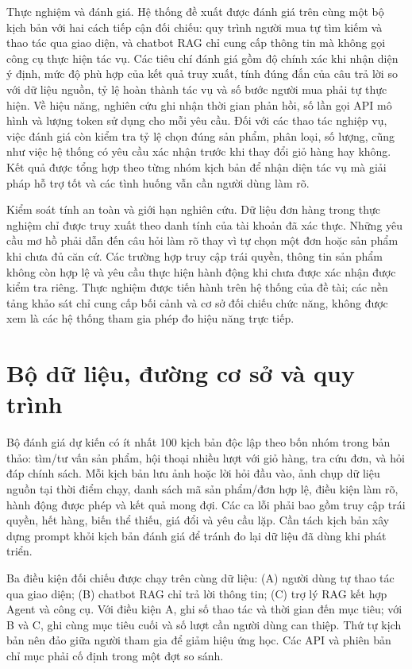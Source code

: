 \documentclass[12pt,a4paper,oneside]{report}
\begin{document}
Thực nghiệm và đánh giá. Hệ thống đề xuất được đánh giá trên cùng một bộ kịch bản với hai cách tiếp cận đối chiếu: quy trình người mua tự tìm kiếm và thao tác qua giao diện, và chatbot RAG chỉ cung cấp thông tin mà không gọi công cụ thực hiện tác vụ. Các tiêu chí đánh giá gồm độ chính xác khi nhận diện ý định, mức độ phù hợp của kết quả truy xuất, tính đúng đắn của câu trả lời so với dữ liệu nguồn, tỷ lệ hoàn thành tác vụ và số bước người mua phải tự thực hiện. Về hiệu năng, nghiên cứu ghi nhận thời gian phản hồi, số lần gọi API mô hình và lượng token sử dụng cho mỗi yêu cầu. Đối với các thao tác nghiệp vụ, việc đánh giá còn kiểm tra tỷ lệ chọn đúng sản phẩm, phân loại, số lượng, cũng như việc hệ thống có yêu cầu xác nhận trước khi thay đổi giỏ hàng hay không. Kết quả được tổng hợp theo từng nhóm kịch bản để nhận diện tác vụ mà giải pháp hỗ trợ tốt và các tình huống vẫn cần người dùng làm rõ.

Kiểm soát tính an toàn và giới hạn nghiên cứu. Dữ liệu đơn hàng trong thực nghiệm chỉ được truy xuất theo danh tính của tài khoản đã xác thực. Những yêu cầu mơ hồ phải dẫn đến câu hỏi làm rõ thay vì tự chọn một đơn hoặc sản phẩm khi chưa đủ căn cứ. Các trường hợp truy cập trái quyền, thông tin sản phẩm không còn hợp lệ và yêu cầu thực hiện hành động khi chưa được xác nhận được kiểm tra riêng. Thực nghiệm được tiến hành trên hệ thống của đề tài; các nền tảng khảo sát chỉ cung cấp bối cảnh và cơ sở đối chiếu chức năng, không được xem là các hệ thống tham gia phép đo hiệu năng trực tiếp.

\section{Bộ dữ liệu, đường cơ sở và quy trình}
Bộ đánh giá dự kiến có ít nhất 100 kịch bản độc lập theo bốn nhóm trong bản thảo: tìm/tư vấn sản phẩm, hội thoại nhiều lượt với giỏ hàng, tra cứu đơn, và hỏi đáp chính sách. Mỗi kịch bản lưu ảnh hoặc lời hỏi đầu vào, ảnh chụp dữ liệu nguồn tại thời điểm chạy, danh sách mã sản phẩm/đơn hợp lệ, điều kiện làm rõ, hành động được phép và kết quả mong đợi. Các ca lỗi phải bao gồm truy cập trái quyền, hết hàng, biến thể thiếu, giá đổi và yêu cầu lặp. Cần tách kịch bản xây dựng prompt khỏi kịch bản đánh giá để tránh đo lại dữ liệu đã dùng khi phát triển.

Ba điều kiện đối chiếu được chạy trên cùng dữ liệu: (A) người dùng tự thao tác qua giao diện; (B) chatbot RAG chỉ trả lời thông tin; (C) trợ lý RAG kết hợp Agent và công cụ. Với điều kiện A, ghi số thao tác và thời gian đến mục tiêu; với B và C, ghi cùng mục tiêu cuối và số lượt cần người dùng can thiệp. Thứ tự kịch bản nên đảo giữa người tham gia để giảm hiệu ứng học. Các API và phiên bản chỉ mục phải cố định trong một đợt so sánh.
\end{document}
